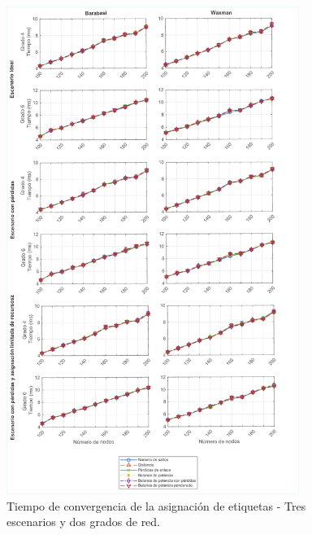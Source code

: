 \begin{figure}[H]
    \centering
    \includegraphics[width=0.85\textwidth]{fig/05_den2ne/den2ne_19.pdf}
    \caption{Tiempo de convergencia de la asignación de etiquetas - Tres escenarios y dos grados de red.}
    \label{fig:f4}
\end{figure}

